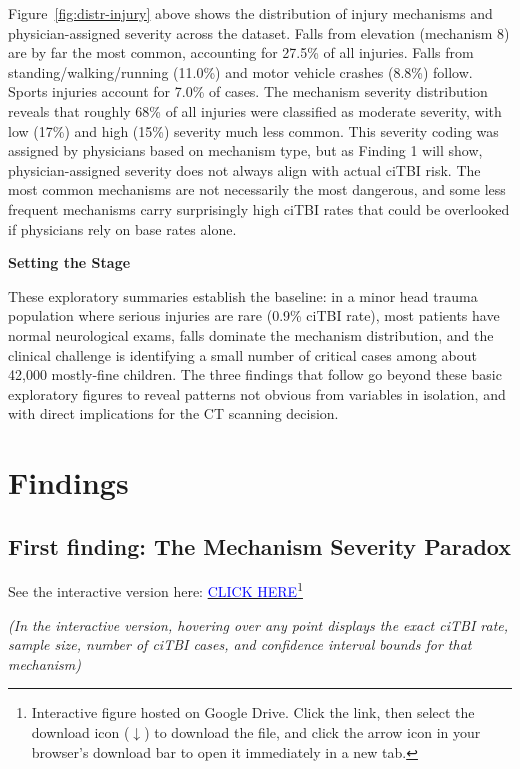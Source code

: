 \documentclass[11pt,letterpaper]{article}
\begin{document}
Figure~\ref{fig:distr-injury} above shows the distribution of injury mechanisms and physician-assigned severity across the dataset. Falls from elevation (mechanism 8) are by far the most common, accounting for 27.5\% of all injuries. Falls from standing/walking/running (11.0\%) and motor vehicle crashes (8.8\%) follow. Sports injuries account for 7.0\% of cases. The mechanism severity distribution reveals that roughly 68\% of all injuries were classified as moderate severity, with low (17\%) and high (15\%) severity much less common. This severity coding was assigned by physicians based on mechanism type, but as Finding 1 will show, physician-assigned severity does not always align with actual ciTBI risk. The most common mechanisms are not necessarily the most dangerous, and some less frequent mechanisms carry surprisingly high ciTBI rates that could be overlooked if physicians rely on base rates alone.

\textbf{Setting the Stage}

These exploratory summaries establish the baseline: in a minor head trauma population where serious injuries are rare (0.9\% ciTBI rate), most patients have normal neurological exams, falls dominate the mechanism distribution, and the clinical challenge is identifying a small number of critical cases among about 42,000 mostly-fine children. The three findings that follow go beyond these basic exploratory figures to reveal patterns not obvious from variables in isolation, and with direct implications for the CT scanning decision. 

\section{Findings}\label{findings}

\subsection{First finding: The Mechanism Severity Paradox}\label{first-finding}

See the interactive version here:  
\href{https://drive.google.com/file/d/1yuHbP5oDKsCgjWVhPhkrpf99ePWDk_SC/view?usp=sharing}{\textcolor{blue}{CLICK HERE}}\footnote{\footnotesize{Interactive figure hosted on Google Drive. Click the link, then select the download icon ($\downarrow$) to download the file, and click the arrow icon in your browser's download bar to open it immediately in a new tab.}}

\textit{\footnotesize{(In the interactive version, hovering over any point displays the exact ciTBI rate, sample size, number of ciTBI cases, and confidence interval bounds for that mechanism)}}
\end{document}
